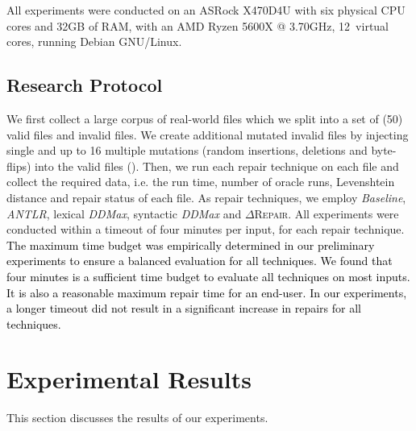\documentclass[acmsmall,screen,review,anonymous]{acmart}
\newcommand{\revise}[1]{\textcolor{black}{#1}}
\newcommand{\approach}{\textsc{$\Delta$Repair}\xspace}
\newcommand{\ddmax}{\textit{DDMax}\xspace}
\begin{document}
All experiments were conducted
on an ASRock X470D4U with six physical CPU cores and 32GB of RAM, with an AMD Ryzen 5600X @ 3.70GHz, 12~virtual cores, running Debian GNU/Linux.


\subsection{Research Protocol}
We first collect a large corpus of  real-world files which we split into a set of (50) valid files and invalid files. We create additional mutated invalid files by injecting single and up to 16 multiple mutations (random insertions, deletions and byte-flips) into the valid files  
().
Then, we run each repair technique on each file and collect the required data, i.e. the run time, number of oracle runs, Levenshtein distance and repair status of each file.
As repair techniques, we employ \emph{Baseline}, %
\emph{ANTLR}, lexical \ddmax, syntactic \ddmax and \approach.
All experiments were conducted within a timeout of four minutes per input, for each repair technique. %
\revise{
The maximum time budget was empirically determined in our preliminary experiments to ensure a balanced evaluation for all techniques. We found that four minutes is a sufficient time budget to evaluate all techniques on most inputs. It is also a reasonable maximum repair time for an end-user. In our experiments, a longer timeout did not result in a significant increase in repairs for all techniques.}














\section{Experimental Results}
\label{sec:results}
This section discusses the %
results %
of our experiments. %
\end{document}
